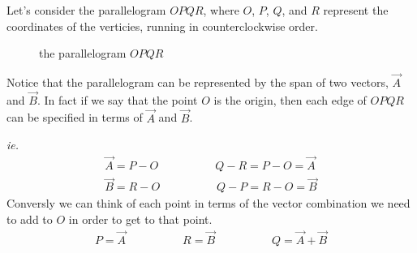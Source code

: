
Let's consider the parallelogram $OPQR$, where $O$, $P$, $Q$, and $R$
represent the coordinates of the verticies, running in counterclockwise
order.

\begin{figure}[!h]
\centering
{}
\caption{the parallelogram $OPQR$}
\end{figure}

Notice that the parallelogram can be represented by the span of two vectors,
$\vec{A}$ and $\vec{B}$. 
In fact if we say that the point $O$ is the origin, then each edge of $OPQR$
can be specified in terms of $\vec{A}$ and $\vec{B}$.


\begin{tcolorbox}[boxsep=.5mm, boxrule=.1pt]
\textit{ie.}\\
\begin{align*}
\vec{A} = P - O \hspace{5em}
Q-R = P-O = \vec{A}\\
\vec{B} = R - O\hspace{5em}
Q-P = R-O = \vec{B}
\end{align*}
\tcblower
Conversly we can think of each point in terms of the vector combination we need to
add to $O$ in order to get to that point.
\begin{align*}
P = \vec{A} \hspace{5em}
R = \vec{B} \hspace{5em}
Q = \vec{A} + \vec{B}
\end{align*}
\end{tcolorbox}

